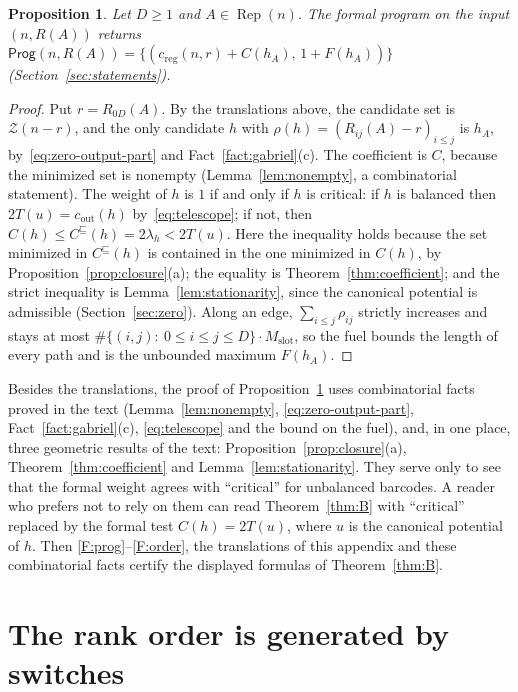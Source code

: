 \documentclass[11pt,a4paper]{article}
\newtheorem{proposition}[theorem]{Proposition}
\theoremstyle{definition}
\theoremstyle{remark}
\numberwithin{equation}{section}
\newcommand{\Rep}{\operatorname{Rep}}
\newcommand{\cout}{c_{\mathrm{out}}}
\newcommand{\creg}{c_{\mathrm{reg}}}
\newcommand{\Zb}{\mathcal Z}
\newcommand{\Prog}{\mathsf{Prog}}
\begin{document}
\begin{proposition}\label{prop:prog-translation}
Let $D\ge1$ and $A\in\Rep(n)$. The formal program on the input $(n,R(A))$ returns $\Prog(n,R(A))=\{(\creg(n,r)+C(h_A),\,1+F(h_A))\}$ (Section~\ref{sec:statements}).
\end{proposition}
\begin{proof}
Put $r=R_{0D}(A)$. By the translations above, the candidate set is $\Zb(n-r)$, and the only candidate $h$ with $\rho(h)=(R_{ij}(A)-r)_{i\le j}$ is $h_A$, by~\eqref{eq:zero-output-part} and Fact~\ref{fact:gabriel}(c). The coefficient is $C$, because the minimized set is nonempty (Lemma~\ref{lem:nonempty}, a combinatorial statement). The weight of $h$ is $1$ if and only if $h$ is critical: if $h$ is balanced then $2T(u)=\cout(h)$ by~\eqref{eq:telescope}; if not, then $C(h)\le C^\sqsubseteq(h)=2\lambda_h<2T(u)$. Here the inequality holds because the set minimized in $C^\sqsubseteq(h)$ is contained in the one minimized in $C(h)$, by Proposition~\ref{prop:closure}(a); the equality is Theorem~\ref{thm:coefficient}; and the strict inequality is Lemma~\ref{lem:stationarity}, since the canonical potential is admissible (Section~\ref{sec:zero}). Along an edge, $\sum_{i\le j}\rho_{ij}$ strictly increases and stays at most $\#\{(i,j):\ 0\le i\le j\le D\}\cdot M_{\mathrm{slot}}$, so the fuel bounds the length of every path and  is the unbounded maximum $F(h_A)$.
\end{proof}

Besides the translations, the proof of Proposition~\ref{prop:prog-translation} uses combinatorial facts proved in the text (Lemma~\ref{lem:nonempty}, \eqref{eq:zero-output-part}, Fact~\ref{fact:gabriel}(c), \eqref{eq:telescope} and the bound on the fuel), and, in one place, three geometric results of the text: Proposition~\ref{prop:closure}(a), Theorem~\ref{thm:coefficient} and Lemma~\ref{lem:stationarity}. They serve only to see that the formal weight agrees with ``critical'' for unbalanced barcodes. A reader who prefers not to rely on them can read Theorem~\ref{thm:B} with ``critical'' replaced by the formal test $C(h)=2T(u)$, where $u$ is the canonical potential of $h$. Then \ref{F:prog}--\ref{F:order}, the translations of this appendix and these combinatorial facts certify the displayed formulas of Theorem~\ref{thm:B}.
\section{The rank order is generated by switches}\label{app:generation}
\end{document}
